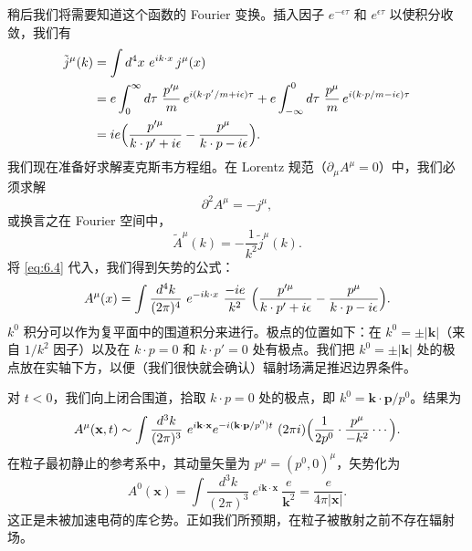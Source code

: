 稍后我们将需要知道这个函数的 Fourier 变换。插入因子 $e^{-\epsilon\tau}$ 和 $e^{\epsilon\tau}$ 以使积分收敛，我们有
\begin{equation}
  \begin{aligned}
    \tilde{j}^\mu(k) &= \int d^4x\ e^{ik\cdot x}\,j^\mu(x)\\
    &= e\int_0^{\infty} d\tau\ \frac{p'^{\mu}}{m}\,
      e^{i(k\cdot p'/m+i\epsilon)\tau}
      + e\int_{-\infty}^{0} d\tau\ \frac{p^{\mu}}{m}\,
        e^{i(k\cdot p/m-i\epsilon)\tau}\\
    &= ie\Bigl( \frac{p'^{\mu}}{k\cdot p' + i\epsilon}
      - \frac{p^{\mu}}{k\cdot p - i\epsilon} \Bigr).
  \end{aligned}
  \label{eq:6.4}
\end{equation}
我们现在准备好求解麦克斯韦方程组。在 Lorentz 规范（$\partial_\mu A^\mu = 0$）中，我们必须求解
\begin{equation}
  \partial^2 A^\mu = -j^\mu,
\end{equation}
或换言之在 Fourier 空间中，
\begin{equation}
  \tilde{A}^\mu(k) = -\frac{1}{k^2}\tilde{j}^\mu(k) .
\end{equation}
将 \eqref{eq:6.4} 代入，我们得到矢势的公式：
\begin{equation}
  A^\mu(x) = \int \frac{d^4k}{(2\pi)^4}\ e^{-ik\cdot x}\
    \frac{-ie}{k^2}\ \Bigl( \frac{p'^{\mu}}{k\cdot p' + i\epsilon}
      - \frac{p^{\mu}}{k\cdot p - i\epsilon} \Bigr).
  \label{eq:6.5}
\end{equation}
$k^0$ 积分可以作为复平面中的围道积分来进行。极点的位置如下：在 $k^0 = \pm|\mathbf{k}|$（来自 $1/k^2$ 因子）以及在 $k\cdot p = 0$ 和 $k\cdot p' = 0$ 处有极点。我们把 $k^0 = \pm|\mathbf{k}|$ 处的极点放在实轴下方，以便（我们很快就会确认）辐射场满足推迟边界条件。

对 $t < 0$，我们向上闭合围道，拾取 $k\cdot p = 0$ 处的极点，即 $k^0 = \mathbf{k}\cdot\mathbf{p}/p^0$。结果为
\begin{equation}
  A^\mu(\mathbf{x}, t) \sim \int \frac{d^3k}{(2\pi)^3}\ e^{i\mathbf{k}\cdot\mathbf{x}}
    e^{-i(\mathbf{k}\cdot\mathbf{p}/p^0)t}\ (2\pi i)\Bigl( \frac{1}{2p^0}
      \cdot \frac{p^\mu}{-k^2}\cdots \Bigr).
\end{equation}
在粒子最初静止的参考系中，其动量矢量为 $p^\mu = (p^0, 0)^\mu$，矢势化为
\begin{equation}
  A^0(\mathbf{x}) = \int \frac{d^3k}{(2\pi)^3}\ e^{i\mathbf{k}\cdot\mathbf{x}}\
    \frac{e}{\mathbf{k}^2} = \frac{e}{4\pi|\mathbf{x}|} .
\end{equation}
这正是未被加速电荷的库仑势。正如我们所预期，在粒子被散射之前不存在辐射场。

